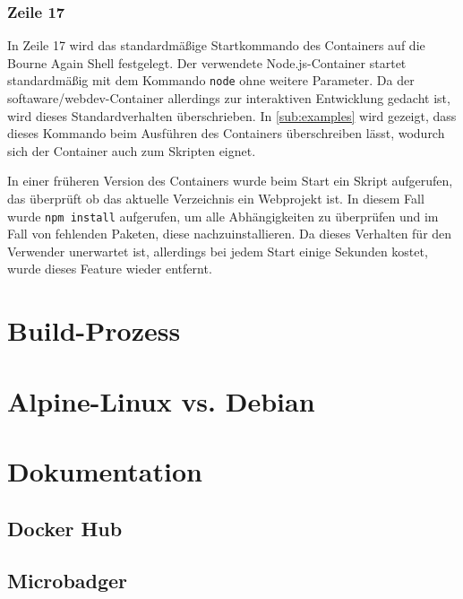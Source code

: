 \subsubsection {Zeile 17}
In Zeile 17 wird das standardmäßige Startkommando des Containers auf die Bourne Again Shell festgelegt.
Der verwendete Node.js-Container startet standardmäßig mit dem Kommando \verb|node| ohne weitere Parameter.
Da der softaware/webdev-Container allerdings zur interaktiven Entwicklung gedacht ist, wird dieses Standardverhalten überschrieben.
In \cref{sub:examples} wird gezeigt, dass dieses Kommando beim Ausführen des Containers überschreiben lässt, wodurch sich der Container auch zum Skripten eignet.

In einer früheren Version des Containers wurde beim Start ein Skript aufgerufen, das überprüft ob das aktuelle Verzeichnis ein Webprojekt ist.
In diesem Fall wurde \verb|npm install| aufgerufen, um alle Abhängigkeiten zu überprüfen und im Fall von fehlenden Paketen, diese nachzuinstallieren.
Da dieses Verhalten für den Verwender unerwartet ist, allerdings bei jedem Start einige Sekunden kostet, wurde dieses Feature wieder entfernt. 


\section{Build-Prozess}
\label{sec:build-process}


\section{Alpine-Linux vs. Debian}
\label{sec:alpine-vs-debian}


\section{Dokumentation}
\label{sec:documentation}

\subsection{Docker Hub}
\label{sub:dockerhub}
\subsection{Microbadger}
\label{sub:microbadger}
